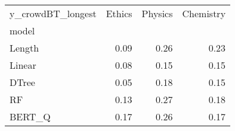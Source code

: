 \begin{tabular}{lrrr}
\toprule
y\_crowdBT\_longest &  Ethics &  Physics &  Chemistry \\
model  &         &          &            \\
\midrule
Length &    0.09 &     0.26 &       0.23 \\
Linear &    0.08 &     0.15 &       0.15 \\
DTree  &    0.05 &     0.18 &       0.15 \\
RF     &    0.13 &     0.27 &       0.18 \\
BERT\_Q &    0.17 &     0.26 &       0.17 \\
\bottomrule
\end{tabular}
